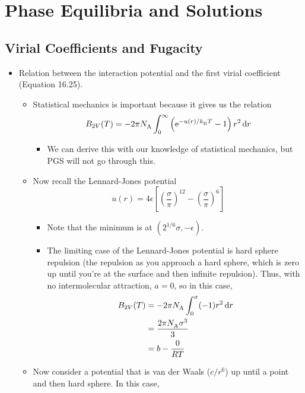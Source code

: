 \documentclass[../notes.tex]{subfiles}
\begin{document}
\chapter{Phase Equilibria and Solutions}
\section{Virial Coefficients and Fugacity}
\begin{itemize}
    \item {}Relation between the interaction potential and the first virial coefficient (Equation 16.25).
    \begin{itemize}
        \item Statistical mechanics is important because it gives us the relation
        \begin{equation*}
            B_{2V}(T) = -2\pi\NA\int_0^\infty\left( \e[-u(r)/\kB T]-1 \right)r^2\dd{r}
        \end{equation*}
        \begin{itemize}
            \item We can derive this with our knowledge of statistical mechanics, but PGS will not go through this.
        \end{itemize}
        \item Now recall the Lennard-Jones potential
        \begin{equation*}
            u(r) = 4\epsilon\left[ \left( \frac{\sigma}{\pi} \right)^{12}-\left( \frac{\sigma}{\pi} \right)^6 \right]
        \end{equation*}
        \begin{itemize}
            \item Note that the minimum is at $(2^{1/6}\sigma,-\epsilon)$.
            \item The limiting case of the Lennard-Jones potential is hard sphere repulsion (the repulsion as you approach a hard sphere, which is zero up until you're at the surface and then infinite repulsion). Thus, with no intermolecular attraction, $a=0$, so in this case,
            \begin{align*}
                B_{2V}(T) &= -2\pi\NA\int_0^\sigma(-1)r^2\dd{r}\\
                &= \frac{2\pi\NA\sigma^3}{3}\\
                &= b-\frac{0}{RT}
            \end{align*}
        \end{itemize}
        \item Now consider a potential that is van der Waals ($c/r^6$) up until a point and then hard sphere. In this case,

\end{itemize}
\end{itemize}
\end{document}
